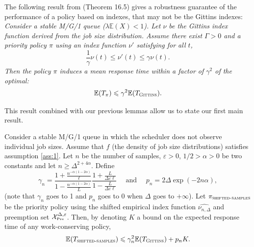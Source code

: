 \documentclass[11pt]{article}
\renewcommand{\epsilon}{\varepsilon}
\renewcommand{\geq}{\geqslant}
\renewcommand{\leq}{\leqslant}
\newcommand{\E}{\mathbb{E}}
\newcommand{\XP}{\mathcal{X}_{\mbox{\tiny Pre}}}
\begin{document}
The following result from \cite{ScullyPhD} (Theorem 16.5) gives a robustness guarantee of the performance of a policy based on indexes, that may not be the Gittins indexes:  \emph{Consider a stable M/G/1 queue  ($\lambda \E(X) <1$).
    Let $\nu$ be the Gittins index function derived from the  job
    size distribution. Assume there exist $\Gamma >0$ and a  priority policy $\pi$ using an index
    function $\nu'$ satisfying for all $t$,
    $$\frac{1}{\gamma} \nu(t) \leq \nu'(t) \leq \gamma \nu(t).$$
    Then the policy $\pi$ induces  a mean response time within a factor of $\gamma^2$ of the optimal:
$$\mathbb{E}(T_\pi) \leq \gamma^2 \mathbb{E}(T_{\textsc{Gittins}}).$$}

This result combined with our previous lemmas allow us to state our first main result.


\begin{theorem}\label{th:main}
    Consider a stable M/G/1 queue in which the scheduler does not observe individual
    job sizes. Assume that $f$ (the density of job size distributions) satisfies assumption \ref{ass:1}. Let $n$ be the number of samples, $\epsilon >0$, $1/2 > \alpha >0$ be two constants and let  $n \geq  \Delta^{2 +4\alpha} $.
     Define
      \[ \gamma_n  = \frac{1 + \frac{n^{-\alpha (1-2\alpha)}}{\ell}}{1 -
            \frac{n^{-\alpha (1-2\alpha)}}{L}} \frac{1 + \frac{L}{\Delta \epsilon
              \ell}}{1 - \frac{L}{\Delta \epsilon \ell}} \quad\mbox{ and }  \quad p_n = 2\Delta \exp(-2n\alpha),\]
              (note that $\gamma_n $ goes to 1  and $p_n$ goes to 0 when $\Delta$ goes  to $+\infty$).
              Let $\pi_{\textsc{shifted-samples}}$ be the priority policy using the  shifted empirical index function $\widehat{\nu_{n,\Delta}}$ and preemption set $\XP^{\Delta,\epsilon}$. Then, by denoting $K$ a bound on the expected response time of any work-conserving policy,
     $$   \mathbb{E}(T_{\textsc{shifted-samples}}) \leq \gamma_n^2
        \mathbb{E}(T_{\textsc{Gittins}}) + p_n K.$$
\end{theorem}
\end{document}
